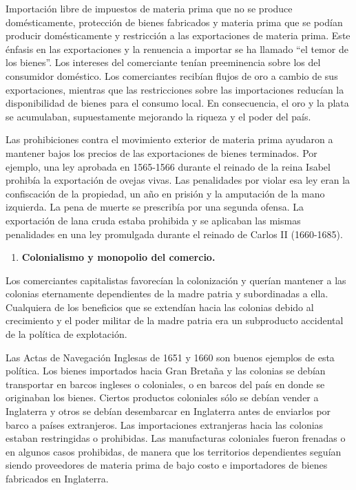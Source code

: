 \documentclass[
  jou,
  floatsintext,
  longtable,
  a4paper,
  nolmodern,
  notxfonts,
  notimes,
  colorlinks=true,linkcolor=blue,citecolor=blue,urlcolor=blue]{apa7}
\providecommand{\tightlist}{%
  \setlength{\itemsep}{0pt}\setlength{\parskip}{0pt}}
\begin{document}
Importación libre de impuestos de materia prima que no se produce
domésticamente, protección de bienes fabricados y materia prima que se
podían producir domésticamente y restricción a las exportaciones de
materia prima. Este énfasis en las exportaciones y la renuencia a
importar se ha llamado ``el temor de los bienes''. Los intereses del
comerciante tenían preeminencia sobre los del consumidor doméstico. Los
comerciantes recibían flujos de oro a cambio de sus exportaciones,
mientras que las restricciones sobre las importaciones reducían la
disponibilidad de bienes para el consumo local. En consecuencia, el oro
y la plata se acumulaban, supuestamente mejorando la riqueza y el poder
del país.

Las prohibiciones contra el movimiento exterior de materia prima
ayudaron a mantener bajos los precios de las exportaciones de bienes
terminados. Por ejemplo, una ley aprobada en 1565-1566 durante el
reinado de la reina Isabel prohibía la exportación de ovejas vivas. Las
penalidades por violar esa ley eran la confiscación de la propiedad, un
año en prisión y la amputación de la mano izquierda. La pena de muerte
se prescribía por una segunda ofensa. La exportación de lana cruda
estaba prohibida y se aplicaban las mismas penalidades en una ley
promulgada durante el reinado de Carlos II (1660-1685).

\begin{enumerate}
\def\labelenumi{\arabic{enumi}.}
\tightlist
\item
  \hspace{0pt} \textbf{Colonialismo y monopolio del comercio.}
\end{enumerate}

Los comerciantes capitalistas favorecían la colonización y querían
mantener a las colonias eternamente dependientes de la madre patria y
subordinadas a ella. Cualquiera de los beneficios que se extendían hacia
las colonias debido al crecimiento y el poder militar de la madre patria
era un subproducto accidental de la política de explotación.

Las Actas de Navegación Inglesas de 1651 y 1660 son buenos ejemplos de
esta política. Los bienes importados hacia Gran Bretaña y las colonias
se debían transportar en barcos ingleses o coloniales, o en barcos del
país en donde se originaban los bienes. Ciertos productos coloniales
sólo se debían vender a Inglaterra y otros se debían desembarcar en
Inglaterra antes de enviarlos por barco a países extranjeros. Las
importaciones extranjeras hacia las colonias estaban restringidas o
prohibidas. Las manufacturas coloniales fueron frenadas o en algunos
casos prohibidas, de manera que los territorios dependientes seguían
siendo proveedores de materia prima de bajo costo e importadores de
bienes fabricados en Inglaterra.
\end{document}
